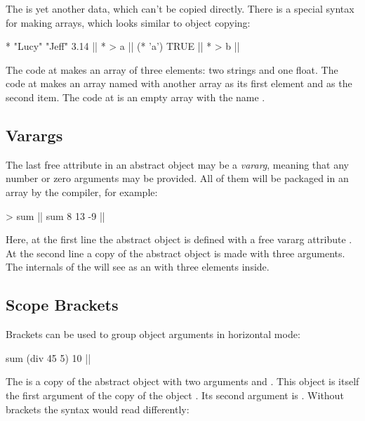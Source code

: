 The  is yet another data, which can't be copied
directly. There is a special syntax for making arrays,
which looks similar to object copying:

\begin{ffcode}
* "Lucy" "Jeff" 3.14 |$\label{ln:array-1}$|
* > a |$\label{ln:array-2a}$|
  (* 'a')
  TRUE |$\label{ln:array-2b}$|
* > b |$\label{ln:array-3}$|
\end{ffcode}

The code at  makes an array of three elements: two strings
and one float. The code at  makes an array named  with another
array as its first element and  as the second item.
The code at  is an empty array with the name .

\subsection{Varargs}

The last free attribute in an abstract object may be a \emph{vararg},
meaning that any number or zero arguments may be provided. All of them
will be packaged in an array by the compiler, for example:

\begin{ffcode}
[x...] > sum |$\label{ln:sum-def}$|
sum 8 13 -9 |$\label{ln:sum-instance}$|
\end{ffcode}

Here, at the first line the abstract object  is defined
with a free vararg attribute . At the second line a copy of the
abstract object is made with three arguments. The internals of
the  will see  as an  with three
elements inside.

\subsection{Scope Brackets}

Brackets can be used to group object arguments in horizontal mode:

\begin{ffcode}
sum (div 45 5) 10  |$\label{ln:sum}$|
\end{ffcode}

The  is a copy of the abstract object 
with two arguments  and . This object is itself
the first argument of the copy of the object . Its second
argument is . Without brackets the syntax would read differently:

